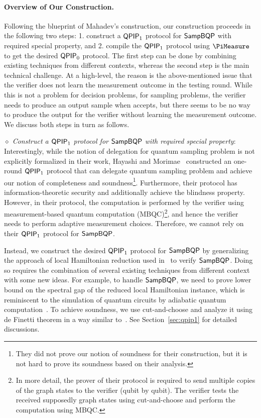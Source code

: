 \paragraph{Overview of Our Construction.}
Following the blueprint of Mahadev's construction, our construction proceeds in the following two steps: 1. construct a $\operatorname{\mathsf{QPIP}}_1$ protocol for $\operatorname{\mathsf{SampBQP}}$ with required special property, and 2. compile the $\operatorname{\mathsf{QPIP}}_1$ protocol using $\PiMeasure$ to get the desired $\operatorname{\mathsf{QPIP}}_0$ protocol. The first step can be done by combining existing techniques from different contexts, whereas the second step is the main technical challenge.
At a high-level, the reason is the above-mentioned issue that the verifier does not learn the measurement outcome in the testing round. While this is not a problem for decision problems,
for sampling problems, the verifier needs to produce an output sample when accepts, but there seems to be no way to produce the output for the verifier without learning the measurement outcome.   
We discuss both steps in turn as follows.

\emph{$\diamond$ Construct a $\operatorname{\mathsf{QPIP}}_1$ protocol for $\operatorname{\mathsf{SampBQP}}$ with required special property}: Interestingly, while the notion of delegation for quantum sampling problem is not explicitly formalized in their work, Hayashi and Morimae~\cite{hayashi2015verifiable} constructed an one-round $\operatorname{\mathsf{QPIP}}_1$ protocol that can delegate quantum sampling problem and achieve our notion of completeness and soundness\footnote{They did not prove our notion of soundness for their construction, but it is not hard to prove its soundness based on their analysis.}. Furthermore, their protocol has information-theoretic security and additionally achieve the blindness property. However, in their protocol, the computation is performed by the verifier using measurement-based quantum computation (MBQC)\footnote{In more detail, the prover of their protocol is required to send multiple copies of the graph states to the verifier (qubit by qubit). The verifier tests the received supposedly graph states using cut-and-choose and perform the computation using MBQC.}, and hence the verifier needs to perform adaptive measurement choices. Therefore, we cannot rely on their $\operatorname{\mathsf{QPIP}}_1$ protocol for $\operatorname{\mathsf{SampBQP}}$. 

Instead, we construct the desired $\operatorname{\mathsf{QPIP}}_1$ protocol for $\operatorname{\mathsf{SampBQP}}$ by generalizing the approach of local Hamiltonian reduction used in~\cite{PhysRevA.93.022326, mf16} to verify $\operatorname{\mathsf{SampBQP}}$. Doing so requires the combination of several existing techniques from different context with some new ideas. For example, to handle $\operatorname{\mathsf{SampBQP}}$, we need to prove lower bound on the spectral gap of the reduced local Hamiltonian instance, which is reminiscent to the simulation of quantum circuits by adiabatic quantum computation~\cite{adiabatic}. To achieve soundness, we use cut-and-choose and analyze it using de Finetti theorem in a  way similar to~\cite{takeuchi2018verification,hayashi2015verifiable}. See Section~\ref{sec:qpip1} for detailed discussions.



